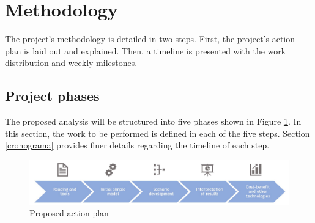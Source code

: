 
\section{Methodology}
The project's methodology is detailed in two steps. First, the project's action plan is laid out and explained. Then, a timeline is presented with the work distribution and weekly milestones.

\subsection{Project phases}

The proposed analysis will be structured into five phases shown in Figure \ref{fig:plan_accion}. In this section, the work to be performed is defined in each of the five steps. Section \ref{cronograma} provides finer details regarding the timeline of each step.


\begin{figure}[h!]
\includegraphics[width=\textwidth]{images/metodologia_trabajo_1.jpg}
\caption{Proposed action plan}
\label{fig:plan_accion}
\centering
\end{figure}


